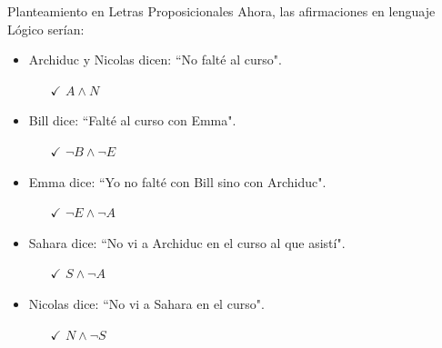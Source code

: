 \documentclass[10pt]{beamer}
\begin{document}
\begin{frame}[fragile]{Planteamiento en Letras Proposicionales}
    Ahora, las afirmaciones en lenguaje Lógico serían: 
    \begin{itemize}
        \item Archiduc y Nicolas dicen: \textquotedblleft No falté al curso".
        \begin{itemize}
        	\item [$\checkmark$]  $ A \land N $ 
        \end{itemize}    
        \item Bill dice: \textquotedblleft Falté al curso con Emma".
        \begin{itemize}
        	\item [$\checkmark$] $ \neg B \land \neg E $ 
        \end{itemize}
        \item Emma dice: \textquotedblleft Yo no falté con Bill sino con Archiduc".
        \begin{itemize}
        	\item [$\checkmark$]  $ \neg E \land \neg A $ 
        \end{itemize}
        \item Sahara dice: \textquotedblleft No vi a Archiduc en el curso al que asistí".
        \begin{itemize}
        	\item [$\checkmark$]  $ S \land \neg A $ 
        \end{itemize}
        \item Nicolas dice: \textquotedblleft No vi a Sahara en el curso".
        \begin{itemize}
        	\item [$\checkmark$]  $ N \land \neg S $ 
        \end{itemize}
        
    \end{itemize}
\end{frame}
\end{document}
